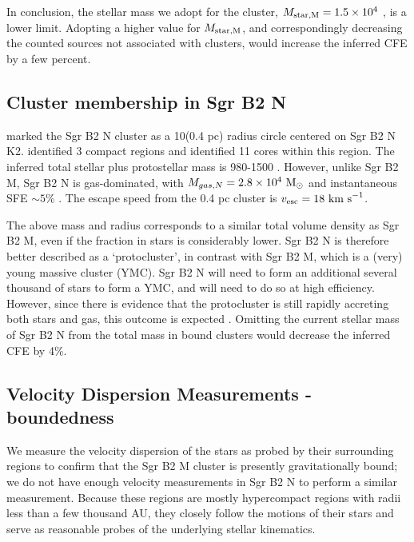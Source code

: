 \documentclass[twocolumn]{aastex62}
\begin{document}
In conclusion, the stellar mass we adopt for the cluster, $M_{\rm star,M}=1.5\times10^{4}$ \msun, is
a lower limit.  Adopting a higher value for $M_{\rm star,M}$, and correspondingly decreasing
the counted sources not associated with clusters, would increase the inferred
CFE by a few percent.

\subsection{Cluster membership in Sgr B2 N}
\citet{Schmiedeke2016a} marked the Sgr B2 N cluster as a 10\arcsec  (0.4 pc) radius circle
centered on Sgr B2 N K2.  \citet{Schmiedeke2016a} identified 3 compact \hii regions
and \citet{Ginsburg2018a} identified 11 cores within this region.  The inferred
total stellar plus protostellar mass is 980-1500 \msun.  However, unlike Sgr B2
M, Sgr B2 N is gas-dominated, with $M_{gas,N} = 2.8\times10^{4}~\mathrm{M}_{\odot}$ and
instantaneous SFE $\sim5\%$ \citep{Schmiedeke2016a}.  The escape speed from the
0.4 pc cluster is
$v_{\rm esc} = 18~\textrm{km~s}^{-1}$.

The above mass and radius corresponds to a similar total volume density as Sgr B2 M, even if the fraction in stars is considerably lower. Sgr B2 N is therefore better described as a `protocluster', in contrast with
Sgr B2 M, which is a (very) young massive cluster (YMC).  Sgr B2 N will need to
form an additional several thousand \msun of stars to form a YMC, and will need
to do so at high efficiency.  However, since there is evidence that the
protocluster is still rapidly accreting both stars and gas, this outcome
is expected \citep[cf.][]{Ginsburg2016b}. Omitting the current stellar mass of Sgr B2 N from the total mass in bound clusters would decrease the inferred CFE by 4\%.


\subsection{Velocity Dispersion Measurements - boundedness}
\label{sec:vdisp}
We measure the velocity dispersion of the stars as probed by their surrounding
\hii regions to confirm that the Sgr B2 M cluster is presently gravitationally
bound; we do not have enough velocity measurements in Sgr B2 N to perform a
similar measurement.
Because these regions are mostly hypercompact \hii regions with radii less than a few
thousand AU, they closely follow the motions of their stars and serve as reasonable
probes of the underlying stellar kinematics.
\end{document}
